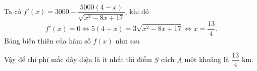 \begin{ex}
{Ta có $f'(x)=3000-\dfrac{5000(4-x)}{\sqrt{x^2-8x+17}}$, khi đó 
$$f'(x)=0\Leftrightarrow 5(4-x)=3\sqrt{x^2-8x+17}\Leftrightarrow x=\dfrac{13}{4}.$$
Bảng biến thiên của hàm số $f(x)$ như sau
\begin{center}
\end{center}
Vậy để chi phí mắc dây diện là ít nhất thì điểm $S$ cách $A$ một khoảng là $\dfrac{13}{4}$ km.
}
\end{ex}



